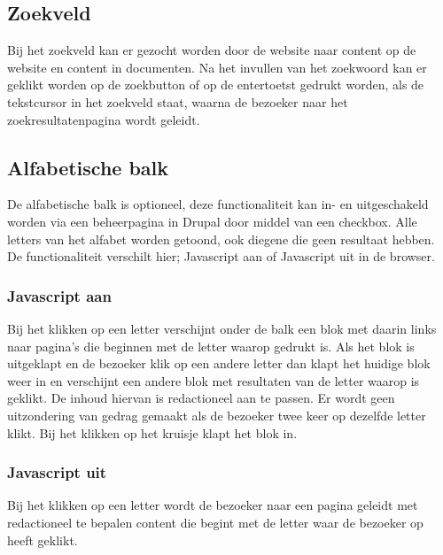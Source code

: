 \subsection{Zoekveld}
\label{sec:zoekveld}
Bij het zoekveld kan er gezocht worden door de website naar content op de website en content in documenten. Na het invullen van het zoekwoord kan er geklikt worden op de zoekbutton of op de entertoetst gedrukt worden, als de tekstcursor in het zoekveld staat, waarna de bezoeker naar het zoekresultatenpagina wordt geleidt. 

\subsection{Alfabetische balk}
\label{sec:alfabetischebalk}
De alfabetische balk is optioneel, deze functionaliteit kan in- en uitgeschakeld worden via een beheerpagina in Drupal door middel van een checkbox. Alle letters van het alfabet worden getoond, ook diegene die geen resultaat hebben. De functionaliteit verschilt hier; Javascript aan of Javascript uit in de browser.

\subsubsection{Javascript aan}
Bij het klikken op een letter verschijnt onder de balk een blok met daarin links naar pagina's die beginnen met de letter waarop gedrukt is. Als het blok is uitgeklapt en de bezoeker klik op een andere letter dan klapt het huidige blok weer in en verschijnt een andere blok met resultaten van de letter waarop is geklikt. De inhoud hiervan is redactioneel aan te passen. Er wordt geen uitzondering van gedrag gemaakt als de bezoeker twee keer op dezelfde letter klikt. Bij het klikken op het kruisje klapt het blok in.

\subsubsection{Javascript uit}
Bij het klikken op een letter wordt de bezoeker naar een pagina geleidt met redactioneel te bepalen content die begint met de letter waar de bezoeker op heeft geklikt.
